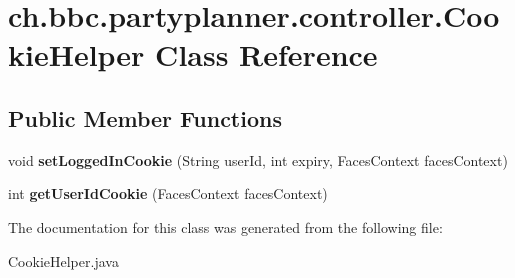 \hypertarget{classch_1_1bbc_1_1partyplanner_1_1controller_1_1_cookie_helper}{}\section{ch.\+bbc.\+partyplanner.\+controller.\+Cookie\+Helper Class Reference}
\label{classch_1_1bbc_1_1partyplanner_1_1controller_1_1_cookie_helper}
\subsection*{Public Member Functions}
\begin{DoxyCompactItemize}
\item 
\hypertarget{classch_1_1bbc_1_1partyplanner_1_1controller_1_1_cookie_helper_a4f1561a00451ec1b947d8da83748a1a9}{}\label{classch_1_1bbc_1_1partyplanner_1_1controller_1_1_cookie_helper_a4f1561a00451ec1b947d8da83748a1a9} 
void {\bfseries set\+Logged\+In\+Cookie} (String user\+Id, int expiry, Faces\+Context faces\+Context)
\item 
\hypertarget{classch_1_1bbc_1_1partyplanner_1_1controller_1_1_cookie_helper_a64f4b3a2b843adb1ddb3f3b4354bf8c4}{}\label{classch_1_1bbc_1_1partyplanner_1_1controller_1_1_cookie_helper_a64f4b3a2b843adb1ddb3f3b4354bf8c4} 
int {\bfseries get\+User\+Id\+Cookie} (Faces\+Context faces\+Context)
\end{DoxyCompactItemize}


The documentation for this class was generated from the following file\+:\begin{DoxyCompactItemize}
\item 
Cookie\+Helper.\+java\end{DoxyCompactItemize}
